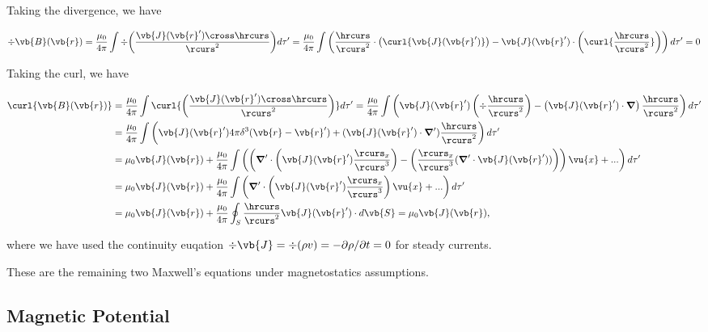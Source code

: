 \documentclass[english,a4paper,12pt]{report}
\begin{document}
Taking the divergence, we have

\begin{equation}
    \div{\vb{B}(\vb{r} )} = \frac{\mu _{0} }{4\pi }\int \div{ \left(\frac{\vb{J} (\vb{r} ') \cross \hrcurs}{\rcurs ^2 }\right) } d\tau ' = \frac{\mu _{0} }{4\pi }\int \left( \frac{\hrcurs }{\rcurs ^2} \cdot \left(\curl{ \vb{J}(\vb{r} ') }\right) - \vb{J}(\vb{r} ') \cdot \left(\curl{ \frac{\hrcurs }{\rcurs ^2}  } \right) \right)  d\tau ' = 0
\end{equation}

Taking the curl, we have

\begin{equation} \label{ampere} 
    \begin{aligned} 
    \curl{\vb{B} (\vb{r} )} &=  \frac{\mu_0 }{4\pi } \int \curl{\left( \frac{\vb{J} (\vb{r} ') \cross \hrcurs}{\rcurs ^2 } \right)} d\tau ' =   \frac{\mu _{0} }{4\pi }\int \left(\vb{J} (\vb{r} ')\left( \div{\frac{\hrcurs }{\rcurs ^2} }  \right) - \left(\vb{J} (\vb{r} ')\cdot \boldsymbol{\nabla } \right)\frac{\hrcurs }{\rcurs ^2}  \right)  d\tau ' \\
    &= \frac{\mu_0 }{4\pi }\int \left( \vb{J} (\vb{r} ')4\pi \delta ^3 (\vb{r} -\vb{r} ') + (\vb{J}(\vb{r} ') \cdot \boldsymbol{\nabla }' )\frac{\hrcurs }{\rcurs ^2} \right)d\tau ' \\
    &= \mu_0 \vb{J} (\vb{r} ) + \frac{\mu_0 }{4\pi } \int \left(\left( \boldsymbol{\nabla }' \cdot \left( \vb{J} (\vb{r} ')  \frac{\rcurs _{x} }{\rcurs ^3 }   \right) - \left( \frac{\rcurs _{x} }{\rcurs ^3 } (\boldsymbol{\nabla }' \cdot \vb{J} (\vb{r} ') ) \right)  \right)\vu{x} + ...\right) d\tau ' \\
    &=  \mu_0 \vb{J} (\vb{r} )+ \frac{\mu_0 }{4\pi } \int \left( \boldsymbol{\nabla }' \cdot \left( \vb{J} (\vb{r} ')  \frac{\rcurs _{x} }{\rcurs ^3 }   \right)\vu{x} + ...\right) d\tau ' \\
    &= \mu_0 \vb{J} (\vb{r} ) + \frac{\mu_0 }{4\pi }  \oint_{S} \frac{\hrcurs }{\rcurs ^2} \vb{J} (\vb{r} ')\cdot d\vb{S} = \mu_0 \vb{J} (\vb{r} ),
    \end{aligned} 
\end{equation}

where we have used the continuity euqation \( \div{\vb{J} } = \div{(\rho v)}  = -\partial \rho /\partial t = 0\) for steady currents.  

These are the remaining two Maxwell's equations under magnetostatics assumptions.

\subsection{Magnetic Potential}
\end{document}
